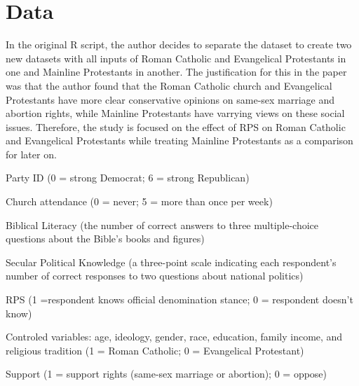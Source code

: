 \documentclass[12pt,letterpaper]{article}
\begin{document}
\section{Data}
	 
	\begin{description}
		\item In the original R script, the author decides to separate the dataset to create two new datasets with all inputs of Roman Catholic and Evangelical Protestants in one and Mainline Protestants in another. The justification for this in the paper was that the author found that the Roman Catholic church and Evangelical Protestants have more clear conservative opinions on same-sex marriage and abortion rights, while Mainline Protestants have varrying views on these social issues. Therefore, the study is focused on the effect of RPS on Roman Catholic and Evangelical Protestants while treating Mainline Protestants as a comparison for later on. 
		\item [Input variables:]
		\item Party ID (0 = strong Democrat; 6 = strong Republican)
		\item Church attendance (0 = never; 5 = more than once per week)
		\item Biblical Literacy (the number of correct answers to three multiple-choice questions about the Bible’s books and figures)
		\item Secular Political Knowledge (a three-point scale indicating each respondent’s number of correct responses to two questions about national politics)
		\item RPS (1 =respondent knows official denomination stance; 0 = respondent doesn't know)
		\item Controled variables: age, ideology, gender, race, education, family income, and religious tradition (1 = Roman Catholic; 0 = Evangelical Protestant) 
		\item[Outcome variable:] 
		\item Support (1 = support rights (same-sex marriage or abortion); 0 = oppose)
	\end{description}
\end{document}
